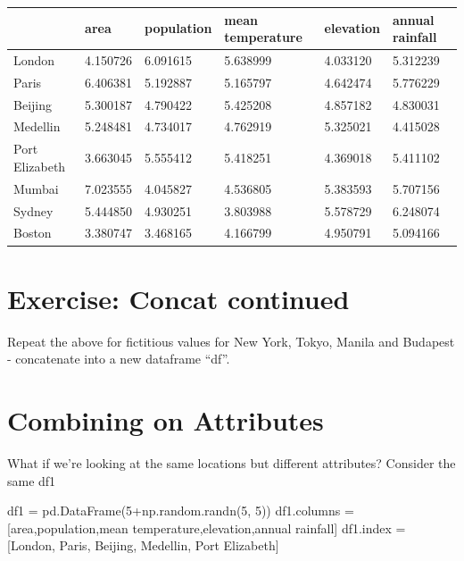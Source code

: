\documentclass[
  letterpaper,
  DIV=11,
  numbers=noendperiod]{scrreprt}
\newenvironment{Shaded}{\begin{snugshade}}{\end{snugshade}}
\newcommand{\DecValTok}[1]{\textcolor[rgb]{0.68,0.00,0.00}{#1}}
\newcommand{\NormalTok}[1]{\textcolor[rgb]{0.00,0.23,0.31}{#1}}
\newcommand{\OperatorTok}[1]{\textcolor[rgb]{0.37,0.37,0.37}{#1}}
\newcommand{\StringTok}[1]{\textcolor[rgb]{0.13,0.47,0.30}{#1}}
\begin{document}
\begin{longtable}[]{@{}llllll@{}}
\toprule\noalign{}
& area & population & mean temperature & elevation & annual rainfall \\
\midrule\noalign{}
\endhead
\bottomrule\noalign{}
\endlastfoot
London & 4.150726 & 6.091615 & 5.638999 & 4.033120 & 5.312239 \\
Paris & 6.406381 & 5.192887 & 5.165797 & 4.642474 & 5.776229 \\
Beijing & 5.300187 & 4.790422 & 5.425208 & 4.857182 & 4.830031 \\
Medellin & 5.248481 & 4.734017 & 4.762919 & 5.325021 & 4.415028 \\
Port Elizabeth & 3.663045 & 5.555412 & 5.418251 & 4.369018 & 5.411102 \\
Mumbai & 7.023555 & 4.045827 & 4.536805 & 5.383593 & 5.707156 \\
Sydney & 5.444850 & 4.930251 & 3.803988 & 5.578729 & 6.248074 \\
Boston & 3.380747 & 3.468165 & 4.166799 & 4.950791 & 5.094166 \\
\end{longtable}

\hypertarget{exercise-concat-continued}{%
\section{Exercise: Concat continued}\label{exercise-concat-continued}}

Repeat the above for fictitious values for New York, Tokyo, Manila and
Budapest - concatenate into a new dataframe ``df''.

\hypertarget{combining-on-attributes}{%
\section{Combining on Attributes}\label{combining-on-attributes}}

What if we're looking at the same locations but different attributes?
Consider the same df1

\begin{Shaded}
\begin{Highlighting}[]
\NormalTok{df1 }\OperatorTok{=}\NormalTok{ pd.DataFrame(}\DecValTok{5}\OperatorTok{+}\NormalTok{np.random.randn(}\DecValTok{5}\NormalTok{, }\DecValTok{5}\NormalTok{))}
\NormalTok{df1.columns }\OperatorTok{=}\NormalTok{ [}\StringTok{\textquotesingle{}area\textquotesingle{}}\NormalTok{,}\StringTok{\textquotesingle{}population\textquotesingle{}}\NormalTok{,}\StringTok{\textquotesingle{}mean temperature\textquotesingle{}}\NormalTok{,}\StringTok{\textquotesingle{}elevation\textquotesingle{}}\NormalTok{,}\StringTok{\textquotesingle{}annual rainfall\textquotesingle{}}\NormalTok{]}
\NormalTok{df1.index }\OperatorTok{=}\NormalTok{ [}\StringTok{\textquotesingle{}London\textquotesingle{}}\NormalTok{, }\StringTok{\textquotesingle{}Paris\textquotesingle{}}\NormalTok{, }\StringTok{\textquotesingle{}Beijing\textquotesingle{}}\NormalTok{, }\StringTok{\textquotesingle{}Medellin\textquotesingle{}}\NormalTok{, }\StringTok{\textquotesingle{}Port Elizabeth\textquotesingle{}}\NormalTok{]}
\end{Highlighting}
\end{Shaded}
\end{document}
